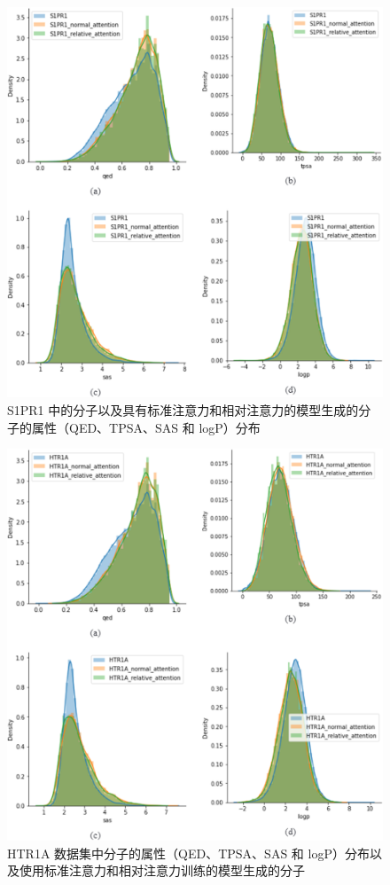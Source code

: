 \begin{translation}
\begin{figure}[H]
  \centering
  \includegraphics[width=\linewidth]{figures/5.png}
  \caption{S1PR1 中的分子以及具有标准注意力和相对注意力的模型生成的分子的属性（QED、TPSA、SAS 和 logP）分布}
  \label{fig:5}
\end{figure}

\begin{figure}[H]
  \centering
  \includegraphics[width=\linewidth]{figures/6.png}
  \caption{HTR1A 数据集中分子的属性（QED、TPSA、SAS 和 logP）分布以及使用标准注意力和相对注意力训练的模型生成的分子}
  \label{fig:6}
\end{figure}


\end{translation}
